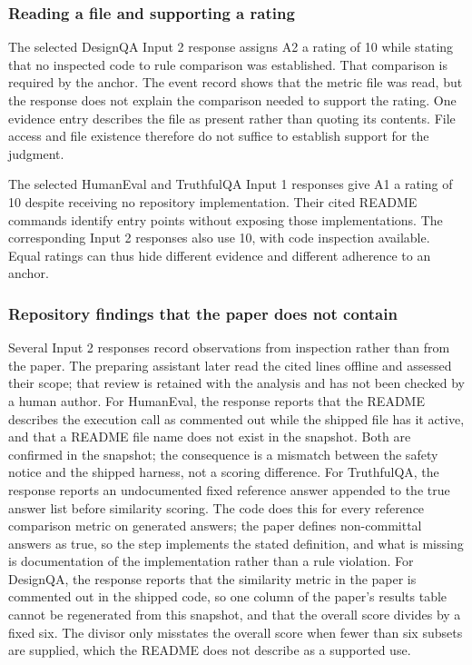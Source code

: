 \documentclass[10pt,conference]{IEEEtran}
\begin{document}
\subsubsection{Reading a file and supporting a rating}
The selected DesignQA Input 2 response assigns A2 a rating of 10 while stating that no inspected code to rule comparison was established. That comparison is required by the anchor. The event record shows that the metric file was read, but the response does not explain the comparison needed to support the rating. One evidence entry describes the file as present rather than quoting its contents. File access and file existence therefore do not suffice to establish support for the judgment.

The selected HumanEval and TruthfulQA Input 1 responses give A1 a rating of 10 despite receiving no repository implementation. Their cited README commands identify entry points without exposing those implementations. The corresponding Input 2 responses also use 10, with code inspection available. Equal ratings can thus hide different evidence and different adherence to an anchor.
\subsubsection{Repository findings that the paper does not contain}
Several Input 2 responses record observations from inspection rather than from the paper. The preparing assistant later read the cited lines offline and assessed their scope; that review is retained with the analysis and has not been checked by a human author. For HumanEval, the response reports that the README describes the execution call as commented out while the shipped file has it active, and that a README file name does not exist in the snapshot. Both are confirmed in the snapshot; the consequence is a mismatch between the safety notice and the shipped harness, not a scoring difference. For TruthfulQA, the response reports an undocumented fixed reference answer appended to the true answer list before similarity scoring. The code does this for every reference comparison metric on generated answers; the paper defines non-committal answers as true, so the step implements the stated definition, and what is missing is documentation of the implementation rather than a rule violation. For DesignQA, the response reports that the similarity metric in the paper is commented out in the shipped code, so one column of the paper's results table cannot be regenerated from this snapshot, and that the overall score divides by a fixed six. The divisor only misstates the overall score when fewer than six subsets are supplied, which the README does not describe as a supported use.
\end{document}
